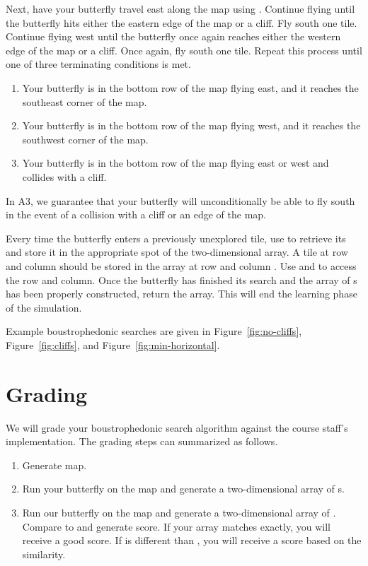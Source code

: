 \documentclass{pset}
\newcommand{\athree}{A3}
\begin{document}
Next, have your butterfly travel east along the map using .
Continue flying until the butterfly hits either the eastern edge of the map or
a cliff. Fly south one tile. Continue flying west until the butterfly once
again reaches either the western edge of the map or a cliff. Once again, fly
south one tile.  Repeat this process until one of three terminating conditions
is met.
\begin{enumerate}
  \item Your butterfly is in the bottom row of the map flying east, and it
    reaches the southeast corner of the map.
  \item Your butterfly is in the bottom row of the map flying west, and it
    reaches the southwest corner of the map.
  \item Your butterfly is in the bottom row of the map flying east or west and
    collides with a cliff.
\end{enumerate}

In \athree{}, we guarantee that your butterfly will unconditionally be able to
fly south in the event of a collision with a cliff or an edge of the map. 

Every time the butterfly enters a previously unexplored tile, use
 to retrieve its  and store it in the
appropriate spot of the two-dimensional array. A tile at row  and
column  should be stored in the array at row  and column
. Use  and  to access
the row and column.  Once the butterfly has finished its search and the array
of s has been properly constructed, return the array. This will
end the learning phase of the simulation.

Example boustrophedonic searches are given in Figure~\ref{fig:no-cliffs},
Figure~\ref{fig:cliffs}, and Figure~\ref{fig:min-horizontal}.

\section*{Grading}
We will grade your boustrophedonic search algorithm against the course staff's
implementation. The grading steps can summarized as follows.
\begin{enumerate}
  \item Generate map.
  \item Run your butterfly on the map and generate a two-dimensional array
     of s.
 \item Run our butterfly on the map and generate a two-dimensional array
    of . Compare  to  and generate
   score.  If your array  matches  exactly, you will receive a
   good score.  If  is different than , you will receive a
   score based on the similarity. 
\end{enumerate}
\end{document}
